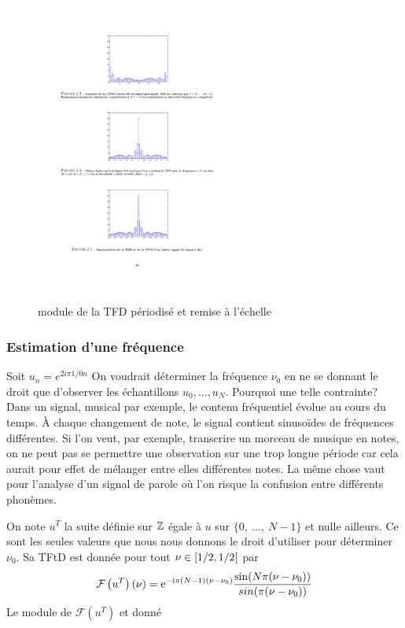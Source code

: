\begin{figure}
  \centering
  \includegraphics[width=0.6\textwidth]{Figures/Figure2-4}\\
  \caption{module de la TFD p\'eriodis\'e et remise \`a l'\'echelle}\label{fig:figure2-4}
\end{figure}

\subsubsection{Estimation d'une fr\'equence}
Soit $u_{n}=e^{2i\pi 1/0n}$ On voudrait d\'{e}terminer la fr\'{e}quence $\nu_{0}$ en ne se donnant le droit que d'observer les \'{e}chantillons $u_{0}, \ldots, u_{N}$. Pourquoi une telle contrainte? Dans un signal, musical par exemple, le contenu fr\'{e}quentiel \'{e}volue au cours du temps. \`{A} chaque changement de note, le signal contient sinusoïdes de fr\'{e}quences diff\'{e}rentes. Si l'on veut, par exemple, transcrire un morceau de musique en notes, on ne peut pas se permettre une observation sur une trop longue p\'{e}riode car cela aurait pour effet de m\'{e}langer entre elles diff\'{e}rentes notes. La m\^{e}me chose vaut pour l'analyse d'un signal de parole o\`{u} l'on risque la confusion entre diff\'{e}rents phon\`{e}mes.

On note $u^{T}$ la suite d\'{e}finie sur $\mathbb{Z}$ \'{e}gale \`{a} $u$ sur $\{0,\ \ldots,\ N-1\}$ et nulle ailleurs. Ce sont les seules valeurs que nous nous donnons le droit d'utiliser pour d\'{e}terminer $\nu_{0}$. Sa TFtD est donnée pour tout 
$\nu\in \left[1/2,1/2\right[$ par
$$ 
\mathcal{F}\left( u^{T} \right)(\nu)=\mathrm{e}^{-\mathrm{i} \pi (N-1)(\nu- \nu_0)} \frac{\sin(N\pi(\nu-\nu_{0}))}{sin(\pi(\nu-\nu_{0}))}
$$
Le module de $\mathcal{F}(u^{T})$ et donn\'{e} 

